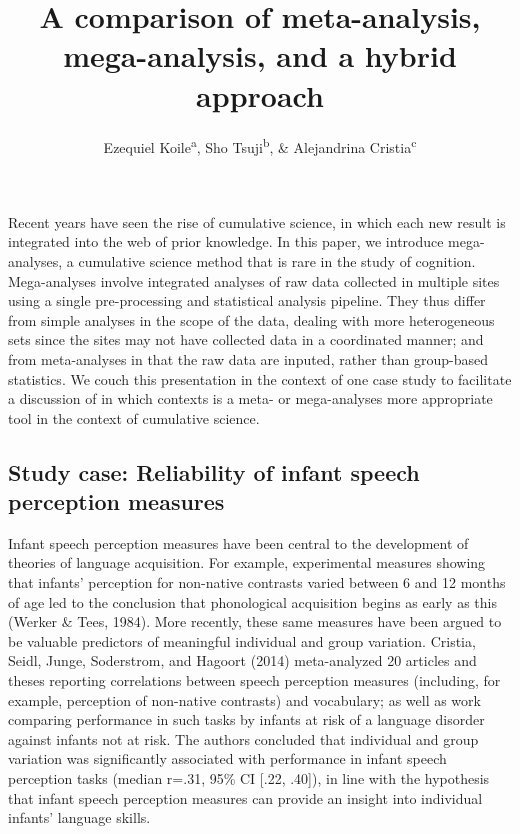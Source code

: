 \documentclass[man]{apa6}
\title{A comparison of meta-analysis, mega-analysis, and a hybrid approach}
\author{Ezequiel Koile\textsuperscript{a}, Sho Tsuji\textsuperscript{b}, \&
Alejandrina Cristia\textsuperscript{c}}
\date{}
\affiliation{
\vspace{0.5cm}
\textsuperscript{a} ADD\\\textsuperscript{b} ADD\\\textsuperscript{c} ADD}
\begin{document}
\maketitle

Recent years have seen the rise of cumulative science, in which each new
result is integrated into the web of prior knowledge. In this paper, we
introduce mega-analyses, a cumulative science method that is rare in the
study of cognition. Mega-analyses involve integrated analyses of raw
data collected in multiple sites using a single pre-processing and
statistical analysis pipeline. They thus differ from simple analyses in
the scope of the data, dealing with more heterogeneous sets since the
sites may not have collected data in a coordinated manner; and from
meta-analyses in that the raw data are inputed, rather than group-based
statistics. We couch this presentation in the context of one case study
to facilitate a discussion of in which contexts is a meta- or
mega-analyses more appropriate tool in the context of cumulative
science.

\subsection{Study case: Reliability of infant speech perception
measures}\label{study-case-reliability-of-infant-speech-perception-measures}

Infant speech perception measures have been central to the development
of theories of language acquisition. For example, experimental measures
showing that infants' perception for non-native contrasts varied between
6 and 12 months of age led to the conclusion that phonological
acquisition begins as early as this (Werker \& Tees, 1984). More
recently, these same measures have been argued to be valuable predictors
of meaningful individual and group variation. Cristia, Seidl, Junge,
Soderstrom, and Hagoort (2014) meta-analyzed 20 articles and theses
reporting correlations between speech perception measures (including,
for example, perception of non-native contrasts) and vocabulary; as well
as work comparing performance in such tasks by infants at risk of a
language disorder against infants not at risk. The authors concluded
that individual and group variation was significantly associated with
performance in infant speech perception tasks (median r=.31, 95\% CI
{[}.22, .40{]}), in line with the hypothesis that infant speech
perception measures can provide an insight into individual infants'
language skills.
\end{document}
